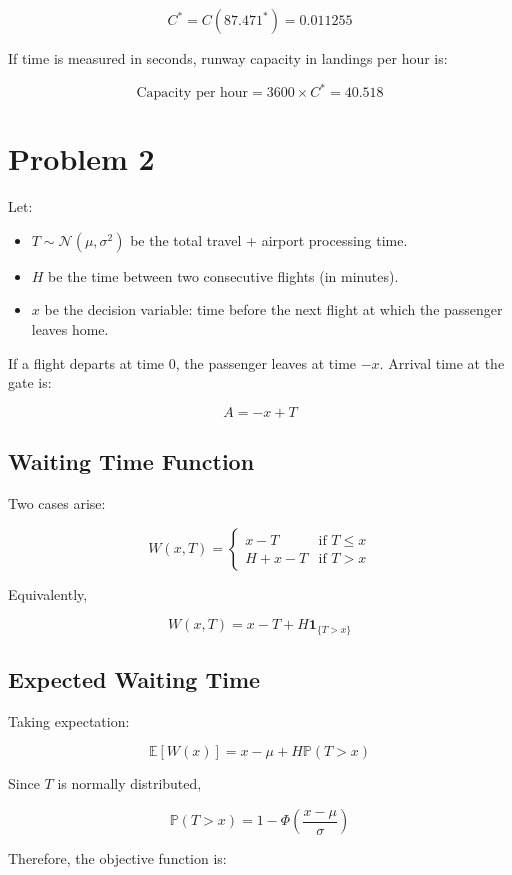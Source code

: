 \documentclass{KPS_assignment}
\begin{document}
\[
C^* = C(87.471^*) = 0.011255
\]

If time is measured in seconds, runway capacity in landings per hour is:

\[
\text{Capacity per hour}
=
3600 \times C^* = 40.518
\]

\section*{Problem 2}

Let:

\begin{itemize}
    \item $T \sim \mathcal{N}(\mu, \sigma^2)$ be the total travel + airport processing time.
    \item $H$ be the time between two consecutive flights (in minutes).
    \item $x$ be the decision variable: time before the next flight at which the passenger leaves home.
\end{itemize}

If a flight departs at time $0$, the passenger leaves at time $-x$.
Arrival time at the gate is:

\[
A = -x + T
\]

\subsection*{Waiting Time Function}

Two cases arise:

\[
W(x,T) =
\begin{cases}
x - T & \text{if } T \le x \\
H + x - T & \text{if } T > x
\end{cases}
\]

Equivalently,

\[
W(x,T) = x - T + H \mathbf{1}_{\{T > x\}}
\]

\subsection*{Expected Waiting Time}

Taking expectation:

\[
\mathbb{E}[W(x)]
=
x - \mu
+
H \mathbb{P}(T > x)
\]

Since $T$ is normally distributed,

\[
\mathbb{P}(T > x)
=
1 - \Phi\left(\frac{x-\mu}{\sigma}\right)
\]

Therefore, the objective function is:
\end{document}
